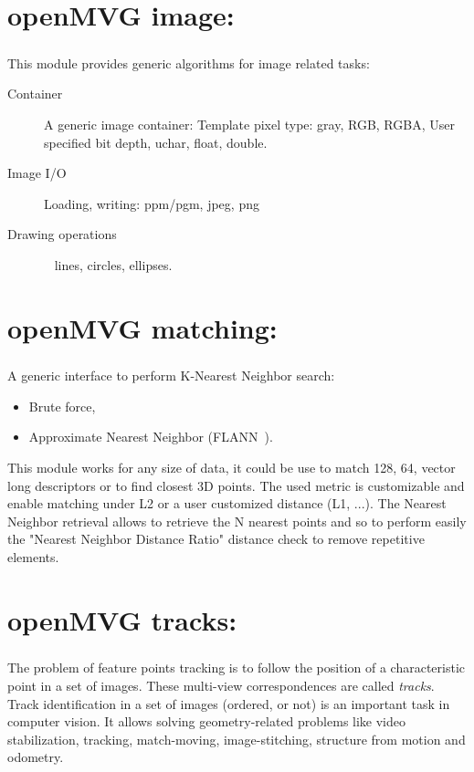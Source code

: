 \documentclass[11pt, letterpaper]{report}
\begin{document}
\newpage
\chapter{openMVG image:}
\paragraph{}
This module provides generic algorithms for image related tasks:
\begin{description}
\item[Container] A generic image container:
\subitem Template pixel type: gray, RGB, RGBA,
\subitem User specified bit depth, uchar, float, double.
\item[Image I/O] Loading, writing:
\subitem ppm/pgm, jpeg, png
\item[Drawing operations] ~
\subitem lines,
\subitem circles,
\subitem ellipses.
\end{description}

\newpage
\chapter{openMVG matching:}
\paragraph{}
A generic interface to perform K-Nearest Neighbor search:
\begin{itemize}
\item Brute force,
\item Approximate Nearest Neighbor (FLANN~\cite{muja_flann_2009}).
\end{itemize}

This module works for any size of data, it could be use to match 128, 64, vector long descriptors or to find closest 3D points. The used metric is customizable and enable matching under L2 or a user customized distance (L1, ...). The Nearest Neighbor retrieval allows to retrieve the N nearest points and so to perform easily the "Nearest Neighbor Distance Ratio" distance check to remove repetitive elements.

\newpage
\chapter{openMVG tracks:}
\paragraph{}
The problem of feature points tracking is to follow the position of a characteristic point in a set of images. These multi-view correspondences are called \emph{tracks}. Track identification in a set of images (ordered, or not) is an important task in computer vision. It allows solving geometry-related problems like video stabilization, tracking, match-moving, image-stitching, structure from motion and odometry.
\end{document}
